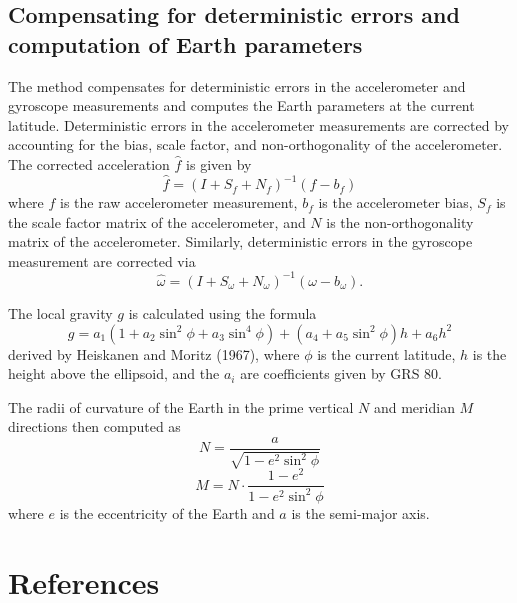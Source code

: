 \documentclass[11pt, oneside]{article}   	%
\begin{document}
\subsection{Compensating for deterministic errors and computation of Earth parameters}
The  method compensates for deterministic errors in the accelerometer and gyroscope measurements and computes the Earth parameters at the current latitude.  Deterministic errors in the accelerometer measurements are corrected by accounting for the bias, scale factor, and non-orthogonality of the accelerometer.  The corrected acceleration $\hat f$ is given by $$\hat f=(I+S_f+N_f)^{-1}(f-b_f)$$ where $f$ is the raw accelerometer measurement, $b_f$ is the accelerometer bias, $S_f$ is the scale factor matrix of the accelerometer, and $N$ is the non-orthogonality matrix of the accelerometer.  Similarly, deterministic errors in the gyroscope measurement are corrected via $$\hat \omega=(I+S_\omega+N_\omega)^{-1}(\omega-b_\omega).$$

The local gravity $g$ is calculated using the formula  $$g=a_1(1+a_2\sin^2\phi+a_3\sin^4\phi)+(a_4+a_5\sin^2\phi)h+a_6h^2$$ derived by Heiskanen and Moritz (1967), where $\phi$ is the current latitude, $h$ is the height above the ellipsoid, and the $a_i$ are coefficients given by GRS 80.

The radii of curvature of the Earth in the prime vertical $N$ and meridian $M$ directions then computed as 
$$N=\frac{a}{\sqrt{1-e^2\sin^2\phi}}$$
$$M=N\cdot \frac{1-e^2}{1-e^2\sin^2\phi}$$
where $e$ is the eccentricity of the Earth and $a$ is the semi-major axis.





\section{References}

\begin{small}



\end{small}
\end{document}
